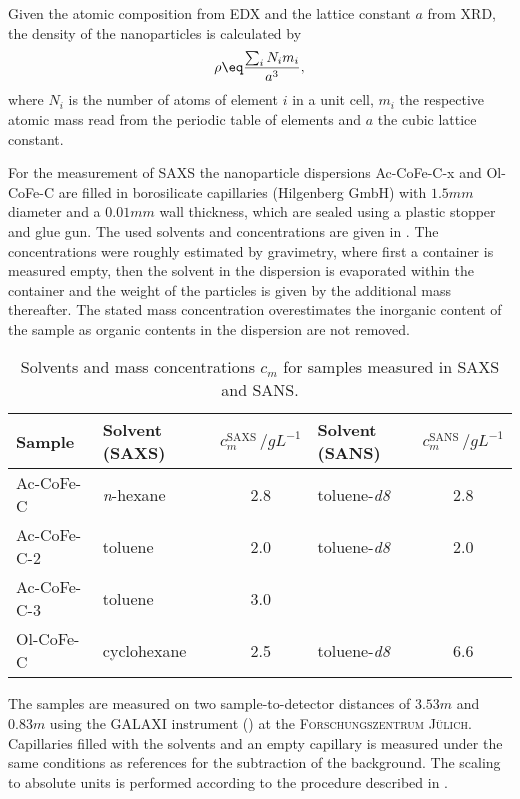 \documentclass[\main/dresen_thesis.tex]{subfiles}
\begin{document}
    Given the atomic composition from EDX and the lattice constant $a$ from XRD, the density of the nanoparticles is calculated by
    \begin{align}
      \rho \eq \frac{\sum_i N_i m_i}{a^3},
    \end{align}
    where $N_i$ is the number of atoms of element $i$ in a unit cell, $m_i$ the respective atomic mass read from the periodic table of elements and $a$ the cubic lattice constant.

    For the measurement of SAXS the nanoparticle dispersions Ac-CoFe-C-x and Ol-CoFe-C are filled in borosilicate capillaries (Hilgenberg GmbH) with $1.5 \unit{mm}$ diameter and a $0.01 \unit{mm}$ wall thickness, which are sealed using a plastic stopper and glue gun.
    The used solvents and concentrations are given in .
    The concentrations were roughly estimated by gravimetry, where first a container is measured empty, then the solvent in the dispersion is evaporated within the container and the weight of the particles is given by the additional mass thereafter.
    The stated mass concentration overestimates the inorganic content of the sample as organic contents in the dispersion are not removed.
    \begin{table}[!htbp]
      \centering
      \caption{\label{tab:monolayers:charMethod:sampleConcentrations}Solvents and mass concentrations $c_m$ for samples measured in SAXS and SANS.}
      \begin{tabular}{ l | l | c | l | c }
        \textbf{Sample}  & Solvent (SAXS) & $c_m^\mathrm{SAXS} \,/ \unit{gL^{-1}}$ & Solvent (SANS) & $c_m^\mathrm{SANS}\,/ \unit{gL^{-1}}$\\
        \hline
        Ac-CoFe-C   & \textit{n}-hexane   & 2.8                 & toluene-\textit{d8}       & 2.8\\
        Ac-CoFe-C-2 & toluene             & 2.0                 & toluene-\textit{d8}       & 2.0\\
        Ac-CoFe-C-3 & toluene             & 3.0                 &                           &    \\
        Ol-CoFe-C   & cyclohexane         & 2.5                 & toluene-\textit{d8}       & 6.6\\
        \hline
      \end{tabular}
    \end{table}

    The samples are measured on two sample-to-detector distances of $3.53 \unit{m}$ and $0.83 \unit{m}$ using the GALAXI instrument () at the \textsc{Forschungszentrum J\"ulich}.
    Capillaries filled with the solvents and an empty capillary is measured under the same conditions as references for the subtraction of the background.
    The scaling to absolute units is performed according to the procedure described in .
\end{document}
